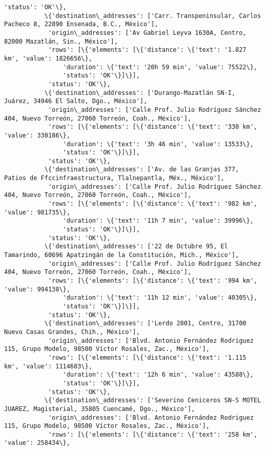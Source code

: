 \documentclass[11pt]{article}
\begin{document}
\begin{Verbatim}[commandchars=\\\{\}]
            'status': 'OK'\},
           \{'destination\_addresses': ['Carr. Transpeninsular, Carlos Pacheco 8, 22890 Ensenada, B.C., México'],
            'origin\_addresses': ['Av Gabriel Leyva 1630A, Centro, 82000 Mazatlán, Sin., México'],
            'rows': [\{'elements': [\{'distance': \{'text': '1.827 km', 'value': 1826656\},
                'duration': \{'text': '20h 59 min', 'value': 75522\},
                'status': 'OK'\}]\}],
            'status': 'OK'\},
           \{'destination\_addresses': ['Durango-Mazatlán SN-I, Juárez, 34946 El Salto, Dgo., México'],
            'origin\_addresses': ['Calle Prof. Julio Rodríguez Sánchez 404, Nuevo Torreón, 27060 Torreón, Coah., México'],
            'rows': [\{'elements': [\{'distance': \{'text': '330 km', 'value': 330186\},
                'duration': \{'text': '3h 46 min', 'value': 13533\},
                'status': 'OK'\}]\}],
            'status': 'OK'\},
           \{'destination\_addresses': ['Av. de las Granjas 377, Patios de Ffccinfraestructura, Tlalnepantla, Méx., México'],
            'origin\_addresses': ['Calle Prof. Julio Rodríguez Sánchez 404, Nuevo Torreón, 27060 Torreón, Coah., México'],
            'rows': [\{'elements': [\{'distance': \{'text': '982 km', 'value': 981735\},
                'duration': \{'text': '11h 7 min', 'value': 39996\},
                'status': 'OK'\}]\}],
            'status': 'OK'\},
           \{'destination\_addresses': ['22 de Octubre 95, El Tamarindo, 60696 Apatzingán de la Constitución, Mich., México'],
            'origin\_addresses': ['Calle Prof. Julio Rodríguez Sánchez 404, Nuevo Torreón, 27060 Torreón, Coah., México'],
            'rows': [\{'elements': [\{'distance': \{'text': '994 km', 'value': 994138\},
                'duration': \{'text': '11h 12 min', 'value': 40305\},
                'status': 'OK'\}]\}],
            'status': 'OK'\},
           \{'destination\_addresses': ['Lerdo 2801, Centro, 31700 Nuevo Casas Grandes, Chih., México'],
            'origin\_addresses': ['Blvd. Antonio Fernández Rodriguez 115, Grupo Modelo, 98500 Víctor Rosales, Zac., México'],
            'rows': [\{'elements': [\{'distance': \{'text': '1.115 km', 'value': 1114603\},
                'duration': \{'text': '12h 6 min', 'value': 43588\},
                'status': 'OK'\}]\}],
            'status': 'OK'\},
           \{'destination\_addresses': ['Severino Ceniceros SN-S MOTEL JUAREZ, Magisterial, 35805 Cuencamé, Dgo., México'],
            'origin\_addresses': ['Blvd. Antonio Fernández Rodriguez 115, Grupo Modelo, 98500 Víctor Rosales, Zac., México'],
            'rows': [\{'elements': [\{'distance': \{'text': '258 km', 'value': 258434\},

\end{Verbatim}
\end{document}
